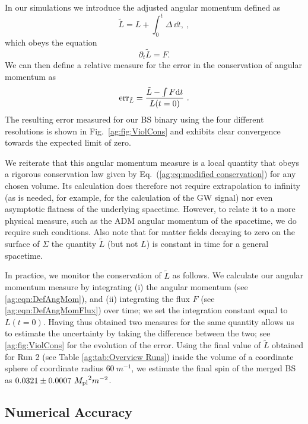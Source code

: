 In our simulations we introduce the adjusted angular momentum
defined as
\begin{equation}
 \tilde{L} = {L}+\int_{0}^t {\Delta} \,\dd t, \label{ag:eqn:DefAngMom}~,
\end{equation}
which obeys the equation 
\begin{equation}
\label{ag:eq:modified conservation}\partial_t\tilde{L} = {F}.
\end{equation}
We can then define a relative measure for the error in the
conservation of angular momentum as
\begin{equation}
    {\rm err }_{\tilde{L}} = \frac{\tilde{L} - \int F {\rm d}t}{{L}(t=0)}~.\label{ag:eqn:ang_mom}
\end{equation}
The resulting error measured for our BS binary using the
four different resolutions is shown in Fig.~\ref{ag:fig:ViolCons}
and exhibits clear convergence towards the expected limit of
zero.

We reiterate that this angular momentum measure is a
local quantity that obeys a rigorous conservation law
given by Eq.~(\ref{ag:eq:modified conservation}) for
any chosen volume.
Its calculation does therefore not require extrapolation
to infinity (as is needed, for example, for the calculation
of the GW signal) nor even asymptotic flatness of the underlying spacetime.
However, to relate it to a more physical measure, such as the ADM angular momentum of the spacetime, we do require such conditions.
Also note that for matter fields decaying to zero on the surface of $\Sigma$ the quantity $\tilde{L}$ (but not $L$) is constant in time for a general spacetime. 

In practice, we monitor the conservation of $\tilde{L}$ as follows.
We calculate our angular momentum measure by integrating (i) the angular momentum (see \ref{ag:eqn:DefAngMom}), and (ii) integrating the flux $F$ (see \ref{ag:eqn:DefAngMomFlux}) over time; we set the integration constant equal to ${L}(t=0)$. Having thus obtained two measures for the same quantity allows us to estimate the uncertainty by taking the difference between the two; see \ref{ag:fig:ViolCons} for the evolution of the error. 
Using the final value of $\tilde{L}$ obtained for Run 2
(see Table \ref{ag:tab:Overview Runs}) inside the volume of
a coordinate sphere of coordinate radius $60~m^{-1}$, we estimate the final spin
of the merged BS as $0.0321 \pm 0.0007~{M_{\rm pl}}^2 m^{-2}$.

\subsection{Numerical Accuracy}
\label{ag:sec:numacc}

